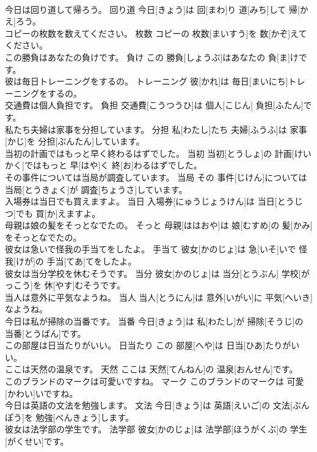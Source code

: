 \documentclass[8pt]{extreport}
\begin{document}
\begin{CJK}{UTF8}{min}
\\	今日は回り道して帰ろう。	回り道	今日[きょう]は 回[まわ]り 道[みち]して 帰[かえ]ろう。	
\\	コピーの枚数を数えてください。	枚数	コピーの 枚数[まいすう]を 数[かぞ]えてください。	
\\	この勝負はあなたの負けです。	負け	この 勝負[しょうぶ]はあなたの 負[ま]けです。	
\\	彼は毎日トレーニングをするの。	トレーニング	彼[かれ]は 毎日[まいにち]トレーニングをするの。	
\\	交通費は個人負担です。	負担	交通費[こうつうひ]は 個人[こじん] 負担[ふたん]です。	
\\	私たち夫婦は家事を分担しています。	分担	私[わたし]たち 夫婦[ふうふ]は 家事[かじ]を 分担[ぶんたん]しています。	
\\	当初の計画ではもっと早く終わるはずでした。	当初	当初[とうしょ]の 計画[けいかく]ではもっと 早[はや]く 終[お]わるはずでした。	
\\	その事件については当局が調査しています。	当局	その 事件[じけん]については 当局[とうきょく]が 調査[ちょうさ]しています。	
\\	入場券は当日でも買えますよ。	当日	入場券[にゅうじょうけん]は 当日[とうじつ]でも 買[か]えますよ。	
\\	母親は娘の髪をそっとなでたの。	そっと	母親[ははおや]は 娘[むすめ]の 髪[かみ]をそっとなでたの。	
\\	彼女は急いで怪我の手当てをしたよ。	手当て	彼女[かのじょ]は 急[いそ]いで 怪我[けが]の 手当[てあ]てをしたよ。	
\\	彼女は当分学校を休むそうです。	当分	彼女[かのじょ]は 当分[とうぶん] 学校[がっこう]を 休[やす]むそうです。	
\\	当人は意外に平気なようね。	当人	当人[とうにん]は 意外[いがい]に 平気[へいき]なようね。	
\\	今日は私が掃除の当番です。	当番	今日[きょう]は 私[わたし]が 掃除[そうじ]の 当番[とうばん]です。	
\\	この部屋は日当たりがいい。	日当たり	この 部屋[へや]は 日当[ひあ]たりがいい。	
\\	ここは天然の温泉です。	天然	ここは 天然[てんねん]の 温泉[おんせん]です。	
\\	このブランドのマークは可愛いですね。	マーク	このブランドのマークは 可愛[かわい]いですね。	
\\	今日は英語の文法を勉強します。	文法	今日[きょう]は 英語[えいご]の 文法[ぶんぽう]を 勉強[べんきょう]します。	
\\	彼女は法学部の学生です。	法学部	彼女[かのじょ]は 法学部[ほうがくぶ]の 学生[がくせい]です。	

\end{CJK}
\end{document}
